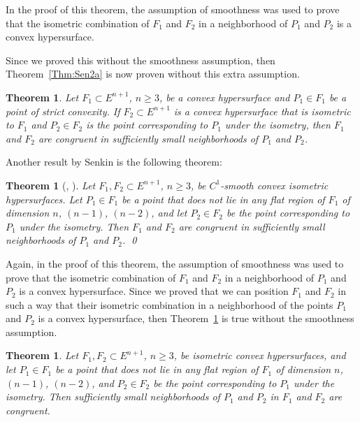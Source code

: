 \documentclass[11pt,oneside]{amsart}
\theoremstyle{theorem}
\newtheorem{theorem}{Theorem}
\newcounter{abc}
\newtheorem{thmPrime}[abc]{Theorem}
\theoremstyle{definition}
\theoremstyle{remark}
\begin{document}
In the proof of this theorem, the assumption of smoothness was used to prove that the isometric combination of $F_1$ and $F_2$ in a neighborhood of $P_1$ and $P_2$ is a convex hypersurface. 

Since we proved this without the smoothness assumption, then Theorem~\ref{Thm:Sen2a} is now proven without this extra assumption.

\begin{thmPrime}
\label{Thm:Prime1}
Let $F_1 \subset E^{n+1}$, $n \ge 3$, be a convex hypersurface and $P_1 \in F_1$ be a point of strict convexity. If $F_2 \subset E^{n+1}$ is a convex hypersurface that is isometric to $F_1$ and $P_2 \in F_2$ is the point corresponding to $P_1$ under the isometry, then $F_1$ and $F_2$ are congruent in sufficiently small neighborhoods of $P_1$ and $P_2$.    
\end{thmPrime}

Another result by Senkin is the following theorem:

\begin{theorem}[\cite{Sen2}, \cite{Sen3}]
\label{Thm:Sen2b}
Let $F_1, F_2\subset E^{n+1}$, $n\ge 3$, be $C^1$-smooth convex isometric hypersurfaces. Let $P_1 \in F_1$ be a point that does not lie in any flat region of $F_1$ of dimension $n$, $(n-1)$, $(n-2)$, and let $P_2 \in F_2$ be the point corresponding to $P_1$ under the isometry.  Then $F_1$ and $F_2$ are congruent in sufficiently small neighborhoods of $P_1$ and $P_2$.   \qed
\end{theorem}

Again, in the proof of this theorem, the assumption of smoothness was used to prove that the isometric combination of $F_1$ and $F_2$ in a neighborhood of $P_1$ and $P_2$ is a convex hypersurface. Since we proved that we can position $F_1$ and $F_2$ in such a way that their isometric combination in a neighborhood of the points $P_1$ and $P_2$ is a convex hypersurface, then Theorem~\ref{Thm:Sen2b} is true without the smoothness assumption.

\begin{thmPrime}
\label{Thm:Prime2}
Let $F_1, F_2 \subset E^{n+1}$, $n \ge 3$, be isometric convex hypersurfaces, and let $P_1 \in F_1$ be a point that does not lie in any flat region of $F_1$ of dimension $n$, $(n-1)$, $(n-2)$, and $P_2 \in F_2$ be the point corresponding to $P_1$ under the isometry. Then sufficiently small neighborhoods of $P_1$ and $P_2$ in $F_1$ and $F_2$ are congruent.
\end{thmPrime}
\end{document}
